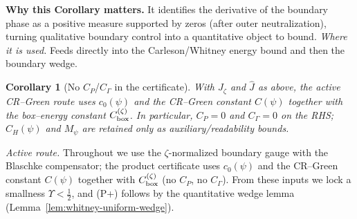 \documentclass[11pt]{article}
\newtheorem{corollary}{Corollary}[section]
\theoremstyle{definition}
\theoremstyle{remark}
\begin{document}




\vspace{1.0cm}
\noindent\textbf{Why this Corollary matters.} It identifies the derivative of the boundary phase as a positive measure supported by zeros (after outer neutralization), turning qualitative boundary control into a quantitative object to bound.
\noindent\textit{Where it is used.} Feeds directly into the Carleson/Whitney energy bound and then the boundary wedge.
\begin{corollary}[No $C_P$/$C_\Gamma$ in the certificate]
With $J_\zeta$ and $\widehat J$ as above, the active CR–Green route uses $c_0(\psi)$ and the CR–Green constant $C(\psi)$ together with the box–energy constant $C_{\rm box}^{(\zeta)}$. In particular, $C_P=0$ and $C_\Gamma=0$ on the RHS; $C_H(\psi)$ and $M_\psi$ are retained only as auxiliary/readability bounds.
\end{corollary}

\noindent\emph{Active route.} Throughout we use the $\zeta$-normalized boundary gauge with the Blaschke compensator;
the product certificate uses $c_0(\psi)$ and the CR–Green constant $C(\psi)$ together
with $C_{\rm box}^{(\zeta)}$ (no $C_P$, no $C_\Gamma$). From these inputs we lock a
smallness $\Upsilon<\tfrac12$, and \textup{(P+)} follows by the quantitative wedge lemma (Lemma~\ref{lem:whitney-uniform-wedge}).

\end{document}
